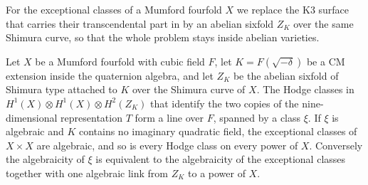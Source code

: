For the exceptional classes of a Mumford fourfold $X$ we replace the K3 surface that carries their transcendental part in \cite{BMB26} by an abelian sixfold $Z_{K}$ over the same Shimura curve, so that the whole problem stays inside abelian varieties.

\begin{theorem}\label{thm:intro-link}
Let $X$ be a Mumford fourfold with cubic field $F$, let $K=F(\sqrt{-\delta})$ be a CM extension inside the quaternion algebra, and let $Z_{K}$ be the abelian sixfold of Shimura type attached to $K$ over the Shimura curve of $X$. The Hodge classes in $H^{1}(X)\otimes H^{1}(X)\otimes H^{2}(Z_{K})$ that identify the two copies of the nine-dimensional representation $T$ form a line over $F$, spanned by a class $\xi$. If $\xi$ is algebraic and $K$ contains no imaginary quadratic field, the exceptional classes of $X\times X$ are algebraic, and so is every Hodge class on every power of $X$. Conversely the algebraicity of $\xi$ is equivalent to the algebraicity of the exceptional classes together with one algebraic link from $Z_{K}$ to a power of $X$.
\end{theorem}

